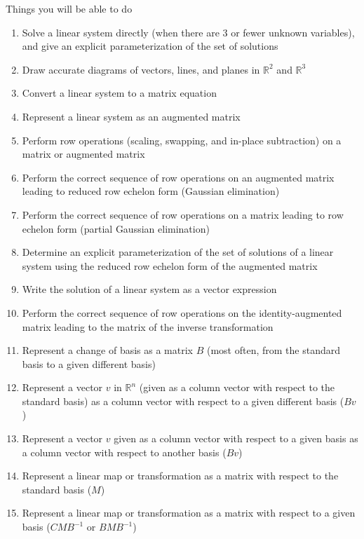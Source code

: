 \documentclass[10pt]{article}
\begin{document}
\setlength\parindent{0pt}

\centerline{ \large Things you will be able to do}
\vspace{1pc}

\begin{enumerate}
\itemsep0em
\item{Solve a linear system directly (when there are 3 or fewer unknown variables), and give an explicit parameterization of the set of solutions}
\item{Draw accurate diagrams of vectors, lines, and planes in $\mathbb{R}^2$ and $\mathbb{R}^3$}
\item{Convert a linear system to a matrix equation}
\item{Represent a linear system as an augmented matrix}
\item{Perform row operations (scaling, swapping, and in-place subtraction) on a matrix or augmented matrix}
\item{Perform the correct sequence of row operations on an augmented matrix leading to reduced row echelon form (Gaussian elimination)}
\item{Perform the correct sequence of row operations on a matrix leading to row echelon form (partial Gaussian elimination)}
\item{Determine an explicit parameterization of the set of solutions of a linear system using the reduced row echelon form of the augmented matrix}
\item{Write the solution of a linear system as a vector expression}
\item{Perform the correct sequence of row operations on the identity-augmented matrix leading to the matrix of the inverse transformation}
\item{Represent a change of basis as a matrix $B$ (most often, from the standard basis to a given different basis)}
\item{Represent a vector $v$ in $\mathbb{R}^n$ (given as a column vector with respect to the standard basis) as a column vector with respect to a given different basis ($Bv$)}
\item{Represent a vector $v$ given as a column vector with respect to a given basis as a column vector with respect to another basis ($Bv$)}
\item{Represent a linear map or transformation as a matrix with respect to the standard basis ($M$)}
\item{Represent a linear map or transformation as a matrix with respect to a given basis ($CMB^{-1}$ or $BMB^{-1}$)}

\end{enumerate}
\end{document}
